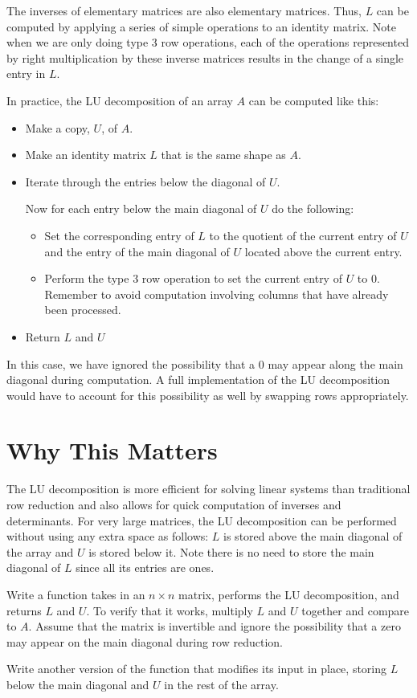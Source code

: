 The inverses of elementary matrices are also elementary matrices. Thus, $L$ can be computed by applying a series of simple operations to an identity matrix.
Note when we are only doing type 3 row operations, each of the operations represented by right multiplication by these inverse matrices results in the change of a single entry in $L$.

In practice, the LU decomposition of an array $A$ can be computed like this:

\begin{itemize}
\item Make a copy, $U$, of $A$.
\item Make an identity matrix $L$ that is the same shape as $A$.
\item Iterate through the entries below the diagonal of $U$.

Now for each entry below the main diagonal of $U$ do the following:
	\begin{itemize}
	\item Set the corresponding entry of $L$ to the quotient of the current entry of $U$ and the entry of the main diagonal of $U$ located above the current entry.
	\item Perform the type 3 row operation to set the current entry of $U$ to 0.
		Remember to avoid computation involving columns that have already been processed.
	\end{itemize}
\item Return $L$ and $U$
\end{itemize}

In this case, we have ignored the possibility that a 0 may appear along the main diagonal during computation. A full implementation of the LU decomposition would have to account for this possibility as well by swapping rows appropriately.

\section*{Why This Matters}
The LU decomposition is more efficient for solving linear systems than traditional row reduction and also allows for quick computation of inverses and determinants. For very large matrices, the LU decomposition can be performed without using any extra space as follows: $L$ is stored above the main diagonal of the array and $U$ is  stored below it.
Note there is no need to store the main diagonal of $L$ since all its entries are ones.

\begin{problem}
\label{prob:LU}
Write a function takes in an $n\times n$ matrix, performs the LU decomposition, and returns $L$ and $U$.
To verify that it works, multiply $L$ and $U$ together and compare to $A$.
Assume that the matrix is invertible and ignore the possibility that a zero may appear on the main diagonal during row reduction.

Write another version of the function that modifies its input in place, storing $L$ below the main diagonal and $U$ in the rest of the array.
\end{problem}

